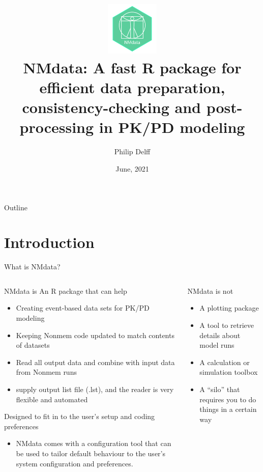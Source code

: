 \documentclass[
  8pt,
  ignorenonframetext,
  aspectratio=169]{beamer}
\title{\includegraphics[width=1in,height=\textheight]{image_2021_06_07T20_32_08_398Z.png}\\
NMdata: A fast R package for efficient data preparation,
consistency-checking and post-processing in PK/PD modeling}
\author{Philip Delff}
\date{June, 2021}
\providecommand{\tightlist}{%
  \setlength{\itemsep}{0pt}\setlength{\parskip}{0pt}}
\begin{document}
\frame{\titlepage}

\begin{frame}
\end{frame}

\begin{frame}{Outline}
\protect\hypertarget{outline}{}
\tableofcontents[hideallsubsections]
\end{frame}

\hypertarget{introduction}{%
\section{Introduction}\label{introduction}}

\begin{frame}{What is NMdata?}
\protect\hypertarget{what-is-nmdata}{}
\begin{columns}[T]
\begin{column}{0.48\textwidth}
\begin{block}{NMdata is}
\protect\hypertarget{nmdata-is}{}
An R package that can help

\begin{itemize}
\tightlist
\item
  Creating event-based data sets for PK/PD modeling
\item
  Keeping Nonmem code updated to match contents of datasets
\item
  Read all output data and combine with input data from Nonmem runs
\item
  supply output list file (.lst), and the reader is very flexible and
  automated
\end{itemize}

Designed to fit in to the user's setup and coding preferences

\begin{itemize}
\tightlist
\item
  NMdata comes with a configuration tool that can be used to tailor
  default behaviour to the user's system configuration and preferences.
\end{itemize}
\end{block}
\end{column}

\begin{column}{0.48\textwidth}
\begin{block}{NMdata is not}
\protect\hypertarget{nmdata-is-not}{}
\begin{itemize}
\item
  A plotting package
\item
  A tool to retrieve details about model runs
\item
  A calculation or simulation toolbox
\item
  A ``silo'' that requires you to do things in a certain way


\end{itemize}
\end{block}
\end{column}
\end{columns}
\end{frame}
\end{document}
